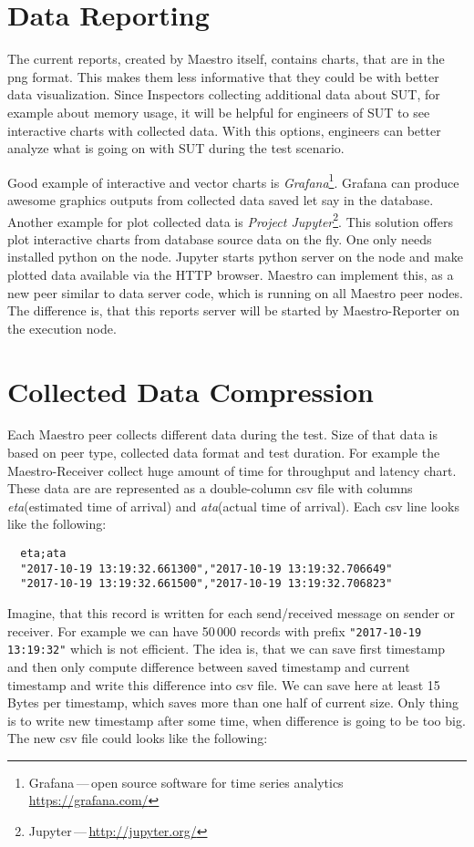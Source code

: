 \section{Data Reporting}
The current reports, created by Maestro itself, contains charts, that are in the png format. This makes them less informative that they could be with better data visualization. Since Inspectors collecting additional data about SUT, for example about memory usage, it will be helpful for engineers of SUT to see interactive charts with collected data. With this options, engineers can better analyze what is going on with SUT during the test scenario.

Good example of interactive and vector charts is \emph{Grafana}\footnote{Grafana\,---\,open source software for time series analytics \url{https://grafana.com/}}. Grafana can produce awesome graphics outputs from collected data saved let say in the database. Another example for plot collected data is \emph{Project Jupyter}\footnote{Jupyter\,---\,\url{http://jupyter.org/}}. This solution offers plot interactive charts from database source data on the fly. One only needs installed python on the node. Jupyter starts python server on the node and make plotted data available via the HTTP browser. Maestro can implement this, as a new peer similar to data server code, which is running on all Maestro peer nodes. The difference is, that this reports server will be started by Maestro-Reporter on the execution node.

\section{Collected Data Compression}
Each Maestro peer collects different data during the test. Size of that data is based on peer type, collected data format and test duration. For example the Maestro-Receiver collect huge amount of time for throughput and latency chart. These data are are represented as a double-column csv file with columns \emph{eta}(estimated time of arrival) and \emph{ata}(actual time of arrival). Each csv line looks like the following:

\begin{verbatim}
  eta;ata
  "2017-10-19 13:19:32.661300","2017-10-19 13:19:32.706649"
  "2017-10-19 13:19:32.661500","2017-10-19 13:19:32.706823"
\end{verbatim}

Imagine, that this record is written for each send/received message on sender or receiver. For example we can have 50\,000 records with prefix \texttt{"2017-10-19 13:19:32"} which is not efficient. The idea is, that we can save first timestamp and then only compute difference between saved timestamp and current timestamp and write this difference into csv file. We can save here at least 15\,Bytes per timestamp, which saves more than one half of current size. Only thing is to write new timestamp after some time, when difference is going to be too big. The new csv file could looks like the following:

